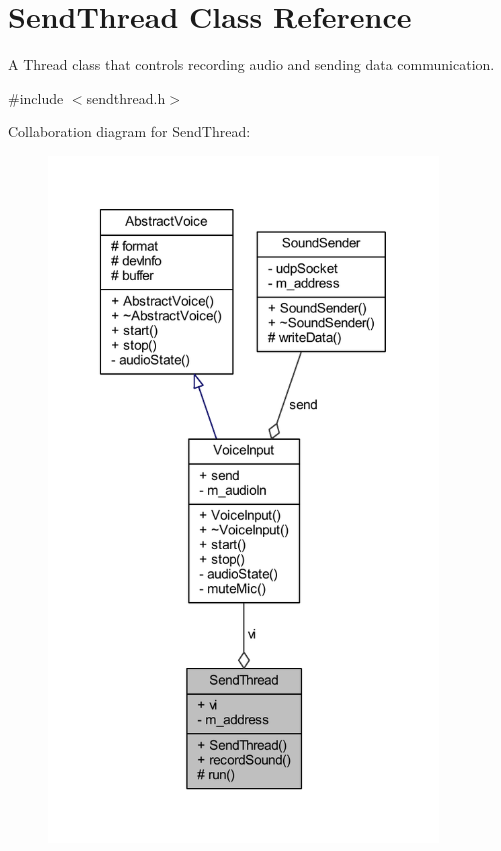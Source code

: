 \hypertarget{class_send_thread}{
\section{\-Send\-Thread \-Class \-Reference}
\label{class_send_thread}
}


\-A \-Thread class that controls recording audio and sending data communication.  




{\ttfamily \#include $<$sendthread.\-h$>$}



\-Collaboration diagram for \-Send\-Thread\-:\nopagebreak
\begin{figure}[H]
\begin{center}
\leavevmode
\includegraphics[width=293pt]{class_send_thread__coll__graph}
\end{center}
\end{figure}
